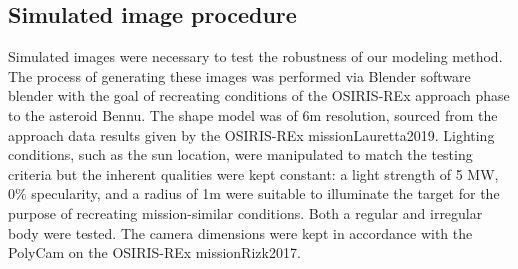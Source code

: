 \subsection{Simulated image procedure}
Simulated images were necessary to test the robustness of our modeling method. The process of generating these images was performed via Blender software {blender} with the goal of recreating conditions of the OSIRIS-REx approach phase to the asteroid Bennu. The shape model was of 6m resolution, sourced from the approach data results given by the OSIRIS-REx mission{Lauretta2019}. Lighting conditions, such as the sun location, were manipulated to match the testing criteria but the inherent qualities were kept constant: a light strength of 5 MW, $0\%$ specularity, and a radius of 1m were suitable to illuminate the target for the purpose of recreating mission-similar conditions. Both a regular and irregular body were tested. The camera dimensions were kept in accordance with the PolyCam on the OSIRIS-REx mission{Rizk2017}.




